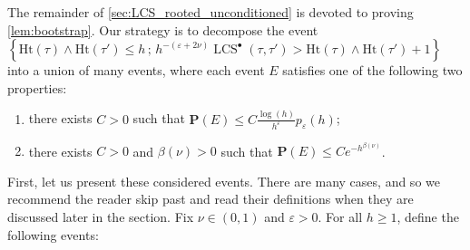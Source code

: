 \documentclass[11pt,reqno]{amsart}
\newcommand{\1}{\mathbf{1}}
\newcommand{\0}{\mathbf{0}}
\newcommand{\prob}{\mathbf{P}}
\newcommand{\Ht}{\mathrm{Ht}}
\newcommand{\LCS}{\operatorname{LCS}}
\newcommand{\eps}{\varepsilon}
\begin{document}
The remainder of \cref{sec:LCS_rooted_unconditioned} is devoted to proving \cref{lem:bootstrap}. Our strategy is to decompose the event $\left\{\Ht(\tau)\wedge\Ht(\tau')\leq h\, ;\, h^{-(\eps+2\nu)}\LCS^\bullet(\tau,\tau')> \Ht(\tau)\wedge\Ht(\tau')+1\right\}$ into a union of many events, where each event $E$ satisfies one of the following two properties:
\begin{enumerate}
    \item[(i)] there exists $C > 0$ such that $\prob(E) \leq C\frac{\log(h)}{h^\varepsilon}p_\varepsilon(h)$;
    \item[(ii)] there exists $C > 0$ and $\beta(\nu) >0$ such that $\prob(E) \leq Ce^{-h^{\beta(\nu)}}$.
\end{enumerate}
First, let us present these considered events. There are many cases, and so we recommend the reader skip past and read their definitions when they are discussed later in the section. Fix $\nu\in(0,1)$ and $\varepsilon>0$. For all $h\geq 1$, define the following events:
\end{document}
